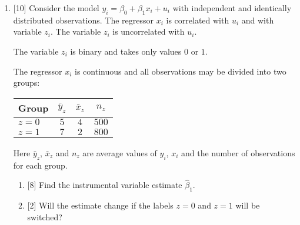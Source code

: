 \documentclass[12pt]{article}
\newcommand{\hb}{\hat{\beta}}
\begin{document}
\begin{enumerate}
    
    

    \item {[10]} Consider the model $y_i = \beta_0 + \beta_1 x_i + u_i$ with independent and identically distributed observations.
    The regressor $x_i$ is correlated with $u_i$ and with variable $z_i$. 
    The variable $z_i$ is uncorrelated with $u_i$. 

    The variable $z_i$ is binary and takes only values $0$ or $1$. 
    
    The regressor $x_i$ is continuous and all observations may be divided into two groups:
        
        \begin{tabular}{lccc}
            \toprule
            Group & $\bar y_z$  & $\bar x_z$ & $n_z$ \\
            \midrule
            $z = 0$ & $5$  & $4$  & $500$ \\
            $z = 1$ & $7$  & $2$  & $800$ \\
          \bottomrule
        \end{tabular}

    Here $\bar y_z$, $\bar x_z$ and $n_z$ are average values of $y_i$, $x_i$ and the number of observations for each group.

    \begin{enumerate}
        \item {[8]} Find the instrumental variable estimate $\hb_1$.
        \item {[2]} Will the estimate change if the labels $z = 0$ and $z = 1$ will be switched?
    \end{enumerate}
    


\end{enumerate}
\end{document}
